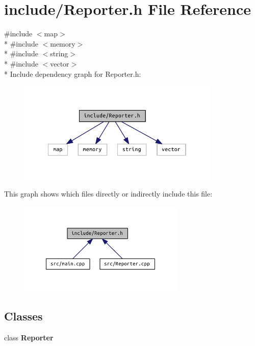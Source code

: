 \section{include/\+Reporter.h File Reference}
\label{_reporter_8h}
{\ttfamily \#include $<$map$>$}\\*
{\ttfamily \#include $<$memory$>$}\\*
{\ttfamily \#include $<$string$>$}\\*
{\ttfamily \#include $<$vector$>$}\\*
Include dependency graph for Reporter.\+h\+:
\nopagebreak
\begin{figure}[H]
\begin{center}
\leavevmode
\includegraphics[width=272pt]{_reporter_8h__incl}
\end{center}
\end{figure}
This graph shows which files directly or indirectly include this file\+:
\nopagebreak
\begin{figure}[H]
\begin{center}
\leavevmode
\includegraphics[width=224pt]{_reporter_8h__dep__incl}
\end{center}
\end{figure}
\subsection*{Classes}
\begin{DoxyCompactItemize}
\item 
class {\bf Reporter}
\end{DoxyCompactItemize}
